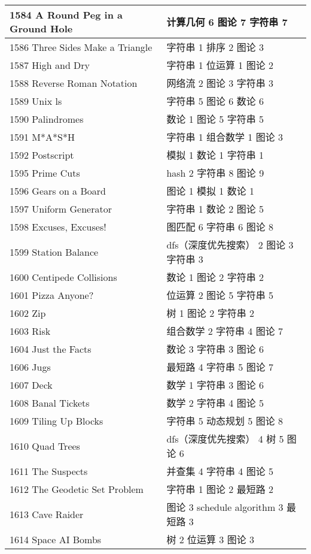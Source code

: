 \begin{longtable}{| p{} | p{} |}
 1584 A Round Peg in a Ground Hole  & 计算几何 6 图论 7 字符串 7 \\ \hline
 1586 Three Sides Make a Triangle  & 字符串 1 排序 2 图论 3 \\ \hline
 1587 High and Dry  & 字符串 1 位运算 1 图论 2 \\ \hline
 1588 Reverse Roman Notation  & 网络流 2 图论 3 字符串 3 \\ \hline
 1589 Unix ls  & 字符串 5 图论 6 数论 6 \\ \hline
 1590 Palindromes  & 数论 1 图论 5 字符串 5 \\ \hline
 1591 M*A*S*H  & 字符串 1 组合数学 1 图论 3 \\ \hline
 1592 Postscript  & 模拟 1 数论 1 字符串 1 \\ \hline
 1595 Prime Cuts  & hash 2 字符串 8 图论 9 \\ \hline
 1596 Gears on a Board  & 图论 1 模拟 1 数论 1 \\ \hline
 1597 Uniform Generator  & 字符串 1 数论 2 图论 5 \\ \hline
 1598 Excuses, Excuses!  & 图匹配 6 字符串 6 图论 8 \\ \hline
 1599 Station Balance  & dfs（深度优先搜索） 2 图论 3 字符串 3 \\ \hline
 1600 Centipede Collisions  & 数论 1 图论 2 字符串 2 \\ \hline
 1601 Pizza Anyone?  & 位运算 2 图论 5 字符串 5 \\ \hline
 1602 Zip  & 树 1 图论 2 字符串 2 \\ \hline
 1603 Risk  & 组合数学 2 字符串 4 图论 7 \\ \hline
 1604 Just the Facts  & 数论 3 字符串 3 图论 6 \\ \hline
 1606 Jugs  & 最短路 4 字符串 5 图论 7 \\ \hline
 1607 Deck  & 数学 1 字符串 3 图论 6 \\ \hline
 1608 Banal Tickets  & 数学 2 字符串 4 图论 5 \\ \hline
 1609 Tiling Up Blocks  & 字符串 5 动态规划 5 图论 8 \\ \hline
 1610 Quad Trees  & dfs（深度优先搜索） 4 树 5 图论 6 \\ \hline
 1611 The Suspects  & 并查集 4 字符串 4 图论 5 \\ \hline
 1612 The Geodetic Set Problem  & 字符串 1 图论 2 最短路 2 \\ \hline
 1613 Cave Raider  & 图论 3 schedule algorithm 3 最短路 3 \\ \hline
 1614 Space AI Bombs  & 树 2 位运算 3 图论 3 \\ \hline

\end{longtable}
